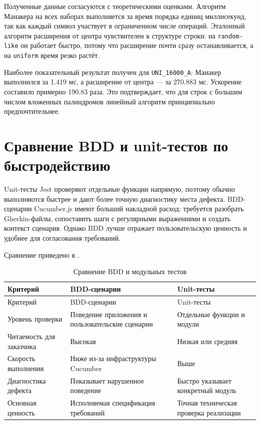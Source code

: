 Полученные данные согласуются с теоретическими оценками. Алгоритм Манакера на всех наборах выполняется за время порядка единиц миллисекунд, так как каждый символ участвует в ограниченном числе операций. Эталонный алгоритм расширения от центра чувствителен к структуре строки: на \texttt{random-like} он работает быстро, потому что расширение почти сразу останавливается, а на \texttt{uniform} время резко растёт.

Наиболее показательный результат получен для \texttt{UNI\_16000\_A}: Манакер выполнился за 1.419 мс, а расширение от центра --- за 270.883 мс. Ускорение составило примерно 190.83 раза. Это подтверждает, что для строк с большим числом вложенных палиндромов линейный алгоритм принципиально предпочтительнее.

\section{Сравнение BDD и unit-тестов по быстродействию} \label{ch3:sec4}

Unit-тесты Jest проверяют отдельные функции напрямую, поэтому обычно выполняются быстрее и дают более точную диагностику места дефекта. BDD-сценарии Cucumber.js имеют больший накладной расход: требуется разобрать Gherkin-файлы, сопоставить шаги с регулярными выражениями и создать контекст сценария. Однако BDD лучше отражает пользовательскую ценность и удобнее для согласования требований.

Сравнение приведено в .

\noindent
\begingroup
\centering
\small
\begin{longtable}[c]{|p{4cm}|p{5.5cm}|p{5.5cm}|}
    \caption{Сравнение BDD и модульных тестов}
    \label{tab:bdd-unit}
    \\
    \hline
    Критерий & BDD-сценарии & Unit-тесты \\ \hline
    \endfirsthead
    \hline
    Критерий & BDD-сценарии & Unit-тесты \\ \hline
    \endhead
    \hline
    Уровень проверки & Поведение приложения и пользовательские сценарии & Отдельные функции и модули \\ \hline
    Читаемость для заказчика & Высокая & Низкая или средняя \\ \hline
    Скорость выполнения & Ниже из-за инфраструктуры Cucumber & Выше \\ \hline
    Диагностика дефекта & Показывает нарушенное поведение & Быстро указывает конкретный модуль \\ \hline
    Основная ценность & Исполняемая спецификация требований & Точная техническая проверка реализации \\ \hline
\end{longtable}
\normalsize
\endgroup

